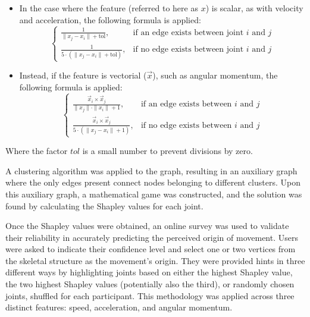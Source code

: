 \begin{itemize}
  \item In the case where the feature (referred to here as $x$) is scalar, as with velocity and acceleration, the following formula is applied:
  \begin{equation}
    \left\{
      \begin{array}{ll}
        \frac{1}{{\|x_{j} - x_{i}\| + \text{tol}}}, & \text{if an edge exists between joint } i \text{ and } j \\
        \frac{1}{{5 \cdot (\|x_{j} - x_{i}\| + \text{tol})}}, & \text{if no edge exists between joint } i \text{ and } j 
        \end{array}
      \right.
  \end{equation}
  \item Instead, if the feature is vectorial ($\vec{x}$), such as angular momentum, the following formula is applied:
  \begin{equation}
    \left\{
      \begin{array}{ll}
        \frac{\vec{x}_{i}\times\vec{x}_{j}}{{\|x_{j}\| \cdot \|x_{i}\|}+1}, & \text{if an edge exists between } i \text{ and } j \\
        \frac{\vec{x}_{i}\times\vec{x}_{j}}{{5 \cdot (\|x_{j} - x_{i}\| + 1)}}, & \text{if no edge exists between } i \text{ and } j 
        \end{array}
      \right.
  \end{equation}
\end{itemize}
Where the factor $tol$ is a small number to prevent divisions by zero.

A clustering algorithm was applied to the graph, resulting in an auxiliary graph where the only edges present connect nodes belonging to different clusters. Upon this auxiliary graph, a mathematical game was constructed, and the solution was found by calculating the Shapley values for each joint.

Once the Shapley values were obtained, an online survey was used to validate their reliability in accurately predicting the perceived origin of movement. Users were asked to indicate their confidence level and select one or two vertices from the skeletal structure as the movement's origin. They were provided hints in three different ways by highlighting joints based on either the highest Shapley value, the two highest Shapley values (potentially also the third), or randomly chosen joints, shuffled for each participant. This methodology was applied across three distinct features: speed, acceleration, and angular momentum.

